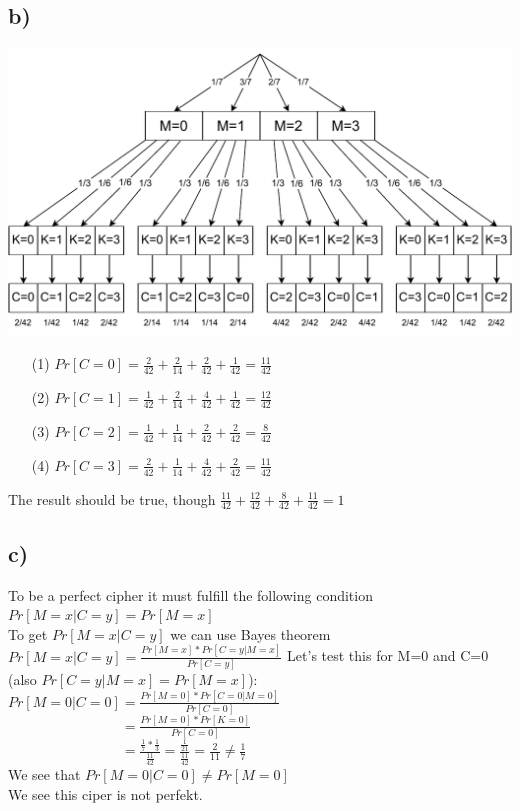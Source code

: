 \documentclass{article}
\theoremstyle{definition}
\theoremstyle{remark}
\begin{document}
\subsection*{b)}
\includegraphics[scale = 1]{perfect_cipher.pdf}
\begin{itemize}
    \item[(1)]$Pr[C=0]=\frac{2}{42}+\frac{2}{14}+\frac{2}{42}+\frac{1}{42}=\frac{11}{42}$
    \item[(2)]$Pr[C=1]=\frac{1}{42}+\frac{2}{14}+\frac{4}{42}+\frac{1}{42}=\frac{12}{42}$
    \item[(3)]$Pr[C=2]=\frac{1}{42}+\frac{1}{14}+\frac{2}{42}+\frac{2}{42}=\frac{8}{42}$
    \item[(4)]$Pr[C=3]=\frac{2}{42}+\frac{1}{14}+\frac{4}{42}+\frac{2}{42}=\frac{11}{42}$
\end{itemize}
The result should be true, though $\frac{11}{42} + \frac{12}{42} + \frac{8}{42} + \frac{11}{42}=1$ 
\subsection*{c)}
To be a perfect cipher it must fulfill the following condition\\
$Pr[M=x|C=y]=Pr[M=x]$\\[2mm]
To get $Pr[M=x|C=y]$ we can use Bayes theorem $Pr[M=x|C=y]=\frac{Pr[M=x]*Pr[C=y|M=x]}{Pr[C=y]}$
Let's test this for M=0 and C=0 (also $Pr[C=y|M=x]=Pr[M=x]$):\\[2mm]
$Pr[M=0|C=0]=\frac{Pr[M=0]*Pr[C=0|M=0]}{Pr[C=0]}$\\[2mm]
$\phantom{Pr[C=0|M=0]}=\frac{Pr[M=0]*Pr[K=0]}{Pr[C=0]}$\\[2mm]
$\phantom{Pr[C=0|M=0]}=\frac{\frac{1}{7}*\frac{1}{3}}{\frac{11}{42}}=\frac{\frac{1}{21}}{\frac{11}{42}}=\frac{2}{11}\neq \frac{1}{7}$\\[2mm]
We see that $Pr[M=0|C=0]\neq Pr[M=0] $ \\[2mm]
We see this ciper is not perfekt.
\end{document}
